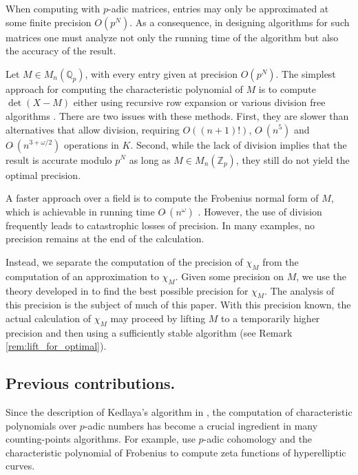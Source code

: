 \documentclass[sigconf]{acmart}
\newcommand{\Z}{\mathbb Z}
\newcommand{\Zp}{\Z_p}
\newcommand{\Q}{\mathbb Q}
\newcommand{\Qp}{\Q_p}
\newcommand{\softO}{O\tilde{~}}
\theoremstyle{definition}
\begin{document}
When computing with $p$-adic matrices, entries may only be approximated
at some finite precision $O(p^N)$.  As a
consequence, in designing algorithms for such matrices one must analyze
not only the running time of the algorithm but also the accuracy of the result.

Let $M \in M_n(\Qp)$, with every entry given at precision $O(p^N)$.
The simplest approach for computing the characteristic polynomial of $M$
is to compute $\det(X{-}M)$ either using recursive row expansion or various division free
algorithms .  There are two issues
with these methods.  First, they are slower than alternatives that allow division,
requiring $O((n+1)!)$, $\softO(n^5)$ and $\softO(n^{3 + \omega/2})$ operations in $K$.  Second,
while the lack of division implies that the result is accurate modulo $p^N$ as
long as $M \in M_n(\Zp)$, they still do not yield the optimal precision.

A faster approach over a field is to compute the Frobenius normal form of $M$,
which is achievable in running time $\softO(n^\omega)$ .
However, the use of division frequently leads to catastrophic losses of precision.
In many examples, no precision remains at the end of the calculation.

Instead, we separate the computation of the precision of $\chi_M$ from the computation
of an approximation to $\chi_M$.  Given some precision on $M$, we use the theory developed in \cite{caruso-roe-vaccon:14a}
to find the best possible precision for $\chi_M$.  The analysis of this precision is the subject
of much of this paper.  With this precision known, the actual calculation of $\chi_M$
may proceed by lifting $M$ to a temporarily higher precision and then using a sufficiently
stable algorithm (see Remark \ref{rem:lift_for_optimal}).

\subsection*{Previous contributions.}

Since the description of Kedlaya's algorithm in
\cite{kedlaya:01a}, the computation of characteristic polynomials
over $p$-adic numbers
has become a crucial ingredient in many counting-points algorithms.
For example, \cite{harvey:07a, harvey:14a} use $p$-adic cohomology
and the characteristic polynomial of Frobenius to compute zeta functions
of hyperelliptic curves.
\end{document}
